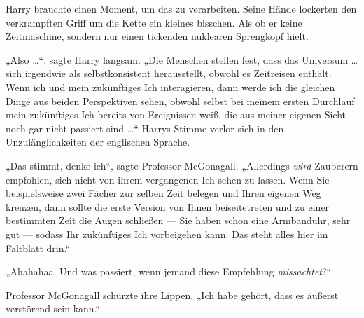 Harry brauchte einen Moment, um das zu verarbeiten. Seine Hände lockerten den verkrampften Griff um die Kette ein kleines bisschen. Als ob er keine Zeitmaschine, sondern nur einen tickenden nuklearen Sprengkopf hielt.

„Also …“, sagte Harry langsam.
„Die Menschen stellen fest, dass das Universum … sich irgendwie als selbstkonsistent herausstellt, obwohl es Zeitreisen enthält. Wenn ich und mein zukünftiges Ich interagieren, dann werde ich die gleichen Dinge aus beiden Perspektiven sehen, obwohl selbst bei meinem ersten Durchlauf mein zukünftiges Ich bereits von Ereignissen weiß, die aus meiner eigenen Sicht noch gar nicht passiert sind …“ Harrys Stimme verlor sich in den Unzulänglichkeiten der englischen Sprache.

„Das stimmt, denke ich“, sagte Professor McGonagall.
„Allerdings \emph{wird} Zauberern empfohlen, sich nicht von ihrem vergangenen Ich sehen zu lassen. Wenn Sie beispielsweise zwei Fächer zur selben Zeit belegen und Ihren eigenen Weg kreuzen, dann sollte die erste Version von Ihnen beiseitetreten und zu einer bestimmten Zeit die Augen schließen — Sie haben schon eine Armbanduhr, sehr gut — sodass Ihr zukünftiges Ich vorbeigehen kann. Das steht alles hier im Faltblatt drin.“

„Ahahahaa. Und was passiert, wenn jemand diese Empfehlung \emph{missachtet}?“

Professor McGonagall schürzte ihre Lippen.
„Ich habe gehört, dass es äußerst verstörend sein kann.“

